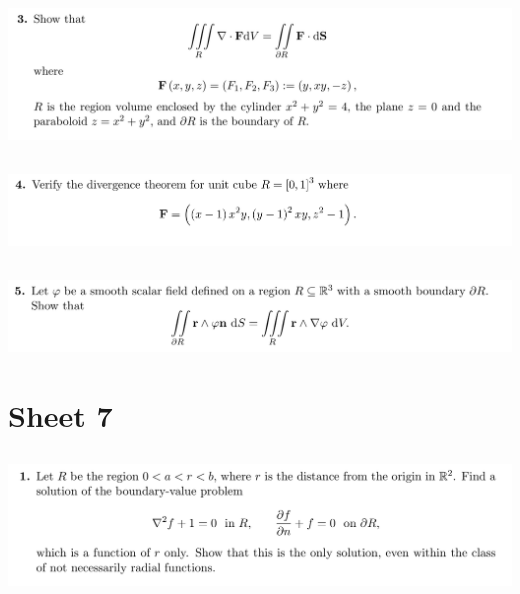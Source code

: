 \subsection{}
\begin{mdframed}
  \includegraphics[width=400pt]{img/oxford-prelims-M5-multivariable-calc-6-3.png}
\end{mdframed}

\subsection{}
\begin{mdframed}
  \includegraphics[width=400pt]{img/oxford-prelims-M5-multivariable-calc-6-4.png}
\end{mdframed}

\subsection{}
\begin{mdframed}
  \includegraphics[width=400pt]{img/oxford-prelims-M5-multivariable-calc-6-5.png}
\end{mdframed}

\newpage
\section{Sheet 7}

\subsection{}
\begin{mdframed}
  \includegraphics[width=400pt]{img/oxford-prelims-M5-multivariable-calc-7-1.png}
\end{mdframed}

